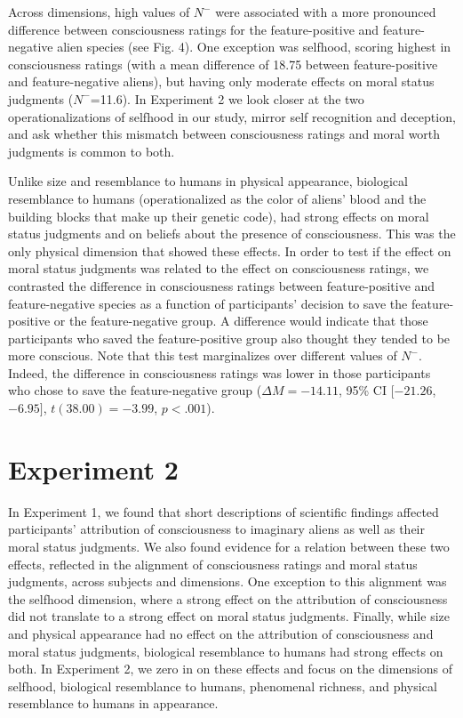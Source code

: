 \documentclass[10pt, letterpaper]{article}
\begin{document}
Across dimensions, high values of \(N^-\) were associated with a more
pronounced difference between consciousness ratings for the
feature-positive and feature-negative alien species (see Fig. 4). One
exception was selfhood, scoring highest in consciousness ratings (with a
mean difference of 18.75 between feature-positive and feature-negative
aliens), but having only moderate effects on moral status judgments
(\(N^-\)=11.6). In Experiment 2 we look closer at the two
operationalizations of selfhood in our study, mirror self recognition
and deception, and ask whether this mismatch between consciousness
ratings and moral worth judgments is common to both.

Unlike size and resemblance to humans in physical appearance, biological
resemblance to humans (operationalized as the color of aliens' blood and
the building blocks that make up their genetic code), had strong effects
on moral status judgments and on beliefs about the presence of
consciousness. This was the only physical dimension that showed these
effects. In order to test if the effect on moral status judgments was
related to the effect on consciousness ratings, we contrasted the
difference in consciousness ratings between feature-positive and
feature-negative species as a function of participants' decision to save
the feature-positive or the feature-negative group. A difference would
indicate that those participants who saved the feature-positive group
also thought they tended to be more conscious. Note that this test
marginalizes over different values of \(N^-\). Indeed, the difference in
consciousness ratings was lower in those participants who chose to save
the feature-negative group (\(\Delta M = -14.11\), 95\% CI \([-21.26\),
\(-6.95]\), \(t(38.00) = -3.99\), \(p < .001\)).

\hypertarget{experiment-2}{%
\section{Experiment 2}\label{experiment-2}}

In Experiment 1, we found that short descriptions of scientific findings
affected participants' attribution of consciousness to imaginary aliens
as well as their moral status judgments. We also found evidence for a
relation between these two effects, reflected in the alignment of
consciousness ratings and moral status judgments, across subjects and
dimensions. One exception to this alignment was the selfhood dimension,
where a strong effect on the attribution of consciousness did not
translate to a strong effect on moral status judgments. Finally, while
size and physical appearance had no effect on the attribution of
consciousness and moral status judgments, biological resemblance to
humans had strong effects on both. In Experiment 2, we zero in on these
effects and focus on the dimensions of selfhood, biological resemblance
to humans, phenomenal richness, and physical resemblance to humans in
appearance.
\end{document}
